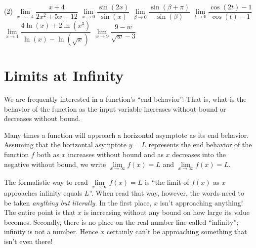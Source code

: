 \documentclass[10pt,oneside,]{book}
\theoremstyle{plain}
\theoremstyle{definition}
\numberwithin{equation}{section}
\newcommand{\fe}[2]{#1\mathopen{}\left(#2\right)\mathclose{}}
\begin{document}
\par
\begin{exercisegroup}(2)
\exercise[2.]\hypertarget{exercise-73}{\null}\(\lim\limits_{x\to-4}\dfrac{x+4}{2x^2+5x-12}\)%
\exercise[3.]\hypertarget{exercise-74}{\null}\(\lim\limits_{x\to0}\dfrac{\fe{\sin}{2x}}{\fe{\sin}{x}}\)%
\exercise[4.]\hypertarget{exercise-75}{\null}\(\lim\limits_{\beta\to0}\dfrac{\fe{\sin}{\beta+\pi}}{\fe{\sin}{\beta}}\)%
\exercise[5.]\hypertarget{exercise-76}{\null}\(\lim\limits_{t\to0}\dfrac{\fe{\cos}{2t}-1}{\fe{\cos}{t}-1}\)%
\exercise[6.]\hypertarget{exercise-77}{\null}\(\lim\limits_{x\to1}\dfrac{4\fe{\ln}{x}+2\fe{\ln}{x^3}}{\fe{\ln}{x}-\fe{\ln}{\sqrt{x}}}\)%
\exercise[7.]\hypertarget{exercise-78}{\null}\(\lim\limits_{w\to9}\dfrac{9-w}{\sqrt{w}-3}\)%
\end{exercisegroup}
\par\smallskip\noindent
\typeout{************************************************}
\typeout{************************************************}
\section[Limits at Infinity]{Limits at Infinity}\label{section-limits-at-infinity}
We are frequently interested in a function's ``end behavior''. That is, what is the behavior of the function as the input variable increases without bound or decreases without bound.%
\par
Many times a function will approach a horizontal asymptote as its end behavior. Assuming that the horizontal asymptote \(y=L\) represents the end behavior of the function \(f\) both as \(x\) increases without bound and as \(x\) decreases into the negative without bound, we write \(\lim\limits_{x\to\infty}\fe{f}{x}=L\) and \(\lim\limits_{x\to\infty}\fe{f}{x}=L\).%
\par
The formalistic way to read \(\lim\limits_{x\to\infty}\fe{f}{x}=L\) is ``the limit of \(\fe{f}{x}\) as \(x\) approaches infinity equals \(L\)''. When read that way, however, the words need to be taken \emph{anything but literally}. In the first place, \(x\) isn't approaching anything! The entire point is that \(x\) is increasing without any bound on how large its value becomes. Secondly, there is no place on the real number line called ``infinity''; infinity is not a number. Hence \(x\) certainly can't be approaching something that isn't even there!%
\typeout{************************************************}
\typeout{************************************************}
\end{document}
